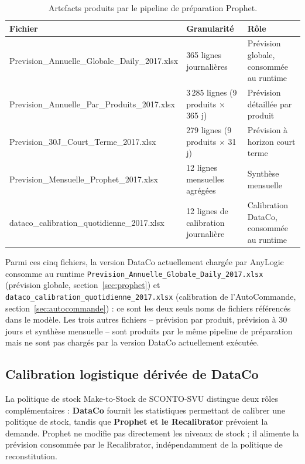 \documentclass[11pt,a4paper]{article}
\newcommand{\code}[1]{\texttt{#1}}
\begin{document}
\begin{table}[htbp]
\centering
\small
\caption{Artefacts produits par le pipeline de préparation Prophet.}
\label{tab:dataco-artefacts}
\begin{tabularx}{\textwidth}{>{\ttfamily}p{4.6cm} l X}
\toprule
Fichier & Granularité & Rôle \\
\midrule
Prevision\_Annuelle\_\allowbreak Globale\_Daily\_2017.xlsx & 365 lignes journalières & Prévision globale, consommée au runtime \\
Prevision\_Annuelle\_\allowbreak Par\_Produits\_2017.xlsx & 3\,285 lignes (9 produits $\times$ 365 j) & Prévision détaillée par produit \\
Prevision\_30J\_\allowbreak Court\_Terme\_2017.xlsx & 279 lignes (9 produits $\times$ 31 j) & Prévision à horizon court terme \\
Prevision\_Mensuelle\_\allowbreak Prophet\_2017.xlsx & 12 lignes mensuelles agrégées & Synthèse mensuelle \\
dataco\_calibration\_\allowbreak quotidienne\_2017.xlsx & 12 lignes de calibration journalière & Calibration DataCo, consommée au runtime \\
\bottomrule
\end{tabularx}
\end{table}

Parmi ces cinq fichiers, la version DataCo actuellement chargée par AnyLogic consomme au runtime \code{Prevision\_Annuelle\_\allowbreak Globale\_Daily\_2017.xlsx} (prévision globale, section~\ref{sec:prophet}) et \code{dataco\_calibration\_\allowbreak quotidienne\_2017.xlsx} (calibration de l'AutoCommande, section~\ref{sec:autocommande}) : ce sont les deux seuls noms de fichiers référencés dans le modèle. Les trois autres fichiers -- prévision par produit, prévision à 30 jours et synthèse mensuelle -- sont produits par le même pipeline de préparation mais ne sont pas chargés par la version DataCo actuellement exécutée.

\subsection{Calibration logistique dérivée de DataCo}

La politique de stock Make-to-Stock de SCONTO-SVU distingue deux rôles complémentaires : \textbf{DataCo} fournit les statistiques permettant de calibrer une politique de stock, tandis que \textbf{Prophet et le Recalibrator} prévoient la demande. Prophet ne modifie pas directement les niveaux de stock ; il alimente la prévision consommée par le Recalibrator, indépendamment de la politique de reconstitution.
\end{document}
